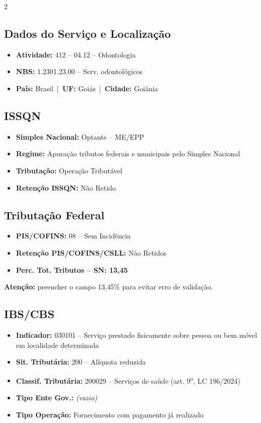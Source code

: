 \documentclass[10pt, a4paper]{article}
\begin{document}
\begin{multicols}{2}

\subsection{Dados do Serviço e Localização}
\begin{itemize}
    \item \textbf{Atividade:} 412 -- 04.12 -- Odontologia
    \item \textbf{NBS:} 1.2301.23.00 -- Serv. odontológicos
    \item \textbf{País:} Brasil \,|\, \textbf{UF:} Goiás \,|\, \textbf{Cidade:} Goiânia
\end{itemize}

\subsection{ISSQN}
\begin{itemize}
    \item \textbf{Simples Nacional:} Optante -- ME/EPP
    \item \textbf{Regime:} Apuração tributos federais e municipais pelo Simples Nacional
    \item \textbf{Tributação:} Operação Tributável
    \item \textbf{Retenção ISSQN:} Não Retido
\end{itemize}

\subsection{Tributação Federal}
\begin{itemize}
    \item \textbf{PIS/COFINS:} 08 -- Sem Incidência
    \item \textbf{Retenção PIS/COFINS/CSLL:} Não Retidos
    \item \textbf{\textcolor{accentColor}{Perc. Tot. Tributos -- SN: 13,45}}
\end{itemize}
\colorbox{warningOrange!15}{%
    \parbox{\dimexpr\linewidth-2\fboxsep}{%
        \scriptsize\textbf{Atenção:} preencher o campo 13,45\% para evitar erro de validação.
    }%
}

\columnbreak

\subsection{IBS/CBS}
\begin{itemize}
    \item \textbf{Indicador:} 030101 -- Serviço prestado fisicamente sobre pessoa ou bem móvel em localidade determinada
    \item \textbf{Sit. Tributária:} 200 -- Alíquota reduzida
    \item \textbf{Classif. Tributária:} 200029 -- Serviços de saúde (art. 9\textsuperscript{o}, LC 196/2024)
    \item \textbf{Tipo Ente Gov.:} \textit{(vazio)}
    \item \textbf{Tipo Operação:} Fornecimento com pagamento já realizado
\end{itemize}


\end{multicols}
\end{document}
